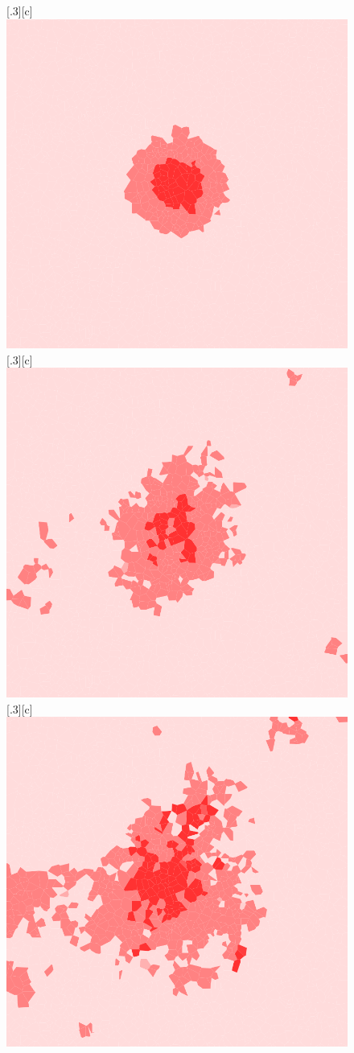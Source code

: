 \documentclass[10pt]{article}
\begin{document}
\begin{figure}[H]
  \centering
  [.3\linewidth][c]{
    \includegraphics[width=.3\linewidth]{images/vca_0.png}
  }
  [.3\linewidth][c]{
    \includegraphics[width=.3\linewidth]{images/vca_500.png}
  }
  [.3\linewidth][c]{
    \includegraphics[width=.3\linewidth]{images/vca_1000.png}
  }


\end{figure}
\end{document}
